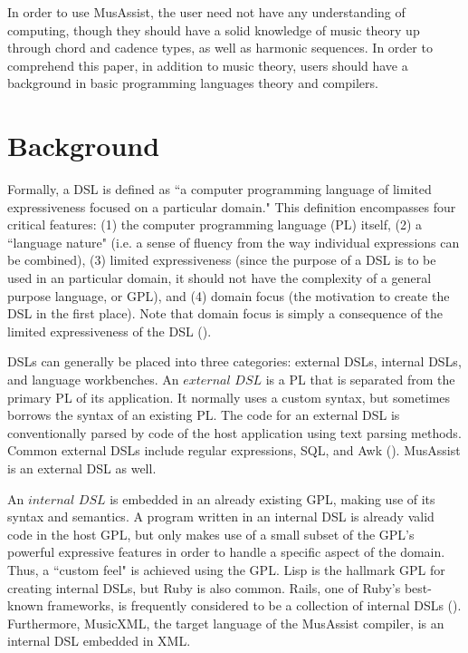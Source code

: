 \documentclass{report}
\newcommand\citeparen[1]{(\cite{#1})}
\begin{document}
In order to use MusAssist, the user need not have any understanding of computing, though they should have a solid knowledge of music theory up through chord and cadence types, as well as harmonic sequences. In order to  comprehend this paper, in addition to music theory, users should have a background in basic programming languages theory and compilers.

\chapter{Background}
\label{chap:background}

Formally, a DSL is defined as ``a computer programming language of limited expressiveness focused on a particular domain." This definition encompasses four critical features: (1) the computer programming language (PL) itself, (2) a ``language nature" (i.e. a sense of fluency from the way individual expressions can be combined), (3) limited expressiveness (since the purpose of a DSL is to be used in an particular domain, it should not have the complexity of a general purpose language, or GPL), and (4) domain focus (the motivation to create the DSL in the first place). Note that domain focus is  simply a consequence of the limited expressiveness of the DSL \citeparen{fowler_parsons_2011}.

DSLs can generally be placed into three categories: external DSLs, internal DSLs, and language workbenches. An $external$ $DSL$ is a PL that is separated  from the primary PL of its application. It normally uses a custom syntax, but sometimes borrows the syntax of an existing PL. The code for an external DSL is conventionally parsed by code of the host application using text parsing methods. Common external DSLs include regular expressions, SQL, and Awk  \citeparen{fowler_parsons_2011}. MusAssist is an external DSL as well.

An $internal$ $DSL$ is embedded in an already existing GPL, making use  of its  syntax and semantics. A program written in an internal DSL is already valid code in the host GPL, but only makes use of a small subset of the GPL's powerful expressive features in order to handle a specific aspect of the domain. Thus, a ``custom feel" is achieved using the GPL. Lisp is the hallmark GPL for creating internal DSLs, but Ruby is also common. Rails, one of Ruby's best-known frameworks, is frequently considered to be a collection of internal DSLs   \citeparen{fowler_parsons_2011}. Furthermore, MusicXML, the target language of the MusAssist compiler, is an internal DSL embedded in XML.
\end{document}
